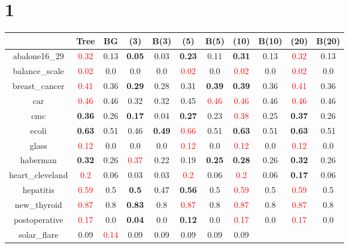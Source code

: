 \documentclass{article}%
\begin{document}
\section*{1}%
\begin{tabular}{c|cccccccccc}%
\hline%
&Tree&BG&(3)&B(3)&(5)&B(5)&(10)&B(10)&(20)&B(20)\\%
\hline%
abalone16\_29&\textcolor{red}{ 
0.32
}&0.13&\textbf{0.05}&0.03&\textbf{0.23}&0.11&\textbf{0.31}&0.13&\textcolor{red}{ 
0.32
}&0.13\\%
\hline%
balance\_scale&\textcolor{red}{ 
0.02
}&0.0&0.0&0.0&\textcolor{red}{ 
0.02
}&0.0&\textcolor{red}{ 
0.02
}&0.0&\textcolor{red}{ 
0.02
}&0.0\\%
\hline%
breast\_cancer&\textcolor{red}{ 
0.41
}&0.36&\textbf{0.29}&0.28&0.31&\textbf{0.39}&\textbf{0.39}&0.36&\textcolor{red}{ 
0.41
}&0.36\\%
\hline%
car&\textcolor{red}{ 
0.46
}&0.46&0.32&0.32&0.45&\textcolor{red}{ 
0.46
}&\textcolor{red}{ 
0.46
}&0.46&\textcolor{red}{ 
0.46
}&0.46\\%
\hline%
cmc&\textbf{0.36}&0.26&\textbf{0.17}&0.04&\textbf{0.27}&0.23&\textcolor{red}{ 
0.38
}&0.25&\textbf{0.37}&0.26\\%
\hline%
ecoli&\textbf{0.63}&0.51&0.46&\textbf{0.49}&\textcolor{red}{ 
0.66
}&0.51&\textbf{0.63}&0.51&\textbf{0.63}&0.51\\%
\hline%
glass&\textcolor{red}{ 
0.12
}&0.0&0.0&0.0&\textcolor{red}{ 
0.12
}&0.0&\textcolor{red}{ 
0.12
}&0.0&\textcolor{red}{ 
0.12
}&0.0\\%
\hline%
haberman&\textbf{0.32}&0.26&\textcolor{red}{ 
0.37
}&0.22&0.19&\textbf{0.25}&\textbf{0.28}&0.26&\textbf{0.32}&0.26\\%
\hline%
heart\_cleveland&\textcolor{red}{ 
0.2
}&0.06&0.03&0.03&\textcolor{red}{ 
0.2
}&0.06&\textcolor{red}{ 
0.2
}&0.06&\textbf{0.17}&0.06\\%
\hline%
hepatitis&\textcolor{red}{ 
0.59
}&0.5&\textbf{0.5}&0.47&\textbf{0.56}&0.5&\textcolor{red}{ 
0.59
}&0.5&\textcolor{red}{ 
0.59
}&0.5\\%
\hline%
new\_thyroid&\textcolor{red}{ 
0.87
}&0.8&\textbf{0.83}&0.8&\textcolor{red}{ 
0.87
}&0.8&\textcolor{red}{ 
0.87
}&0.8&\textcolor{red}{ 
0.87
}&0.8\\%
\hline%
postoperative&\textcolor{red}{ 
0.17
}&0.0&\textbf{0.04}&0.0&\textbf{0.12}&0.0&\textcolor{red}{ 
0.17
}&0.0&\textcolor{red}{ 
0.17
}&0.0\\%
\hline%
solar\_flare&0.09&\textcolor{red}{ 
0.14
}&0.09&0.09&0.09&0.09&0.09&\textcolor{red}{ 
}
\end{tabular}
\end{document}
